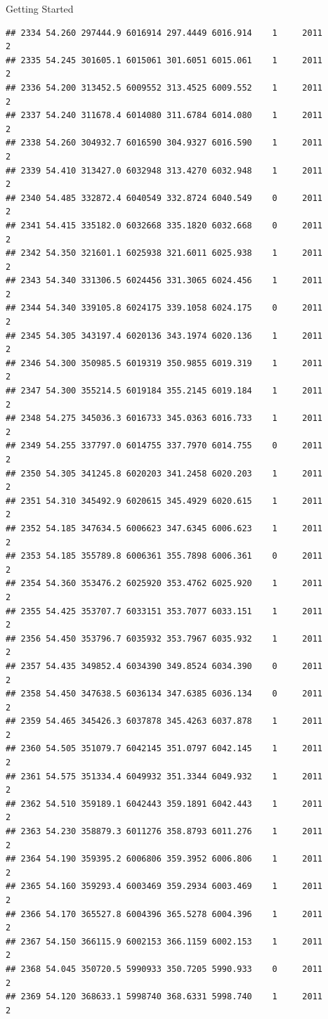 \documentclass[
  ignorenonframetext,
]{beamer}
\begin{document}
\begin{frame}[fragile]{Getting Started}
\begin{verbatim}
## 2334 54.260 297444.9 6016914 297.4449 6016.914    1     2011        2
## 2335 54.245 301605.1 6015061 301.6051 6015.061    1     2011        2
## 2336 54.200 313452.5 6009552 313.4525 6009.552    1     2011        2
## 2337 54.240 311678.4 6014080 311.6784 6014.080    1     2011        2
## 2338 54.260 304932.7 6016590 304.9327 6016.590    1     2011        2
## 2339 54.410 313427.0 6032948 313.4270 6032.948    1     2011        2
## 2340 54.485 332872.4 6040549 332.8724 6040.549    0     2011        2
## 2341 54.415 335182.0 6032668 335.1820 6032.668    0     2011        2
## 2342 54.350 321601.1 6025938 321.6011 6025.938    1     2011        2
## 2343 54.340 331306.5 6024456 331.3065 6024.456    1     2011        2
## 2344 54.340 339105.8 6024175 339.1058 6024.175    0     2011        2
## 2345 54.305 343197.4 6020136 343.1974 6020.136    1     2011        2
## 2346 54.300 350985.5 6019319 350.9855 6019.319    1     2011        2
## 2347 54.300 355214.5 6019184 355.2145 6019.184    1     2011        2
## 2348 54.275 345036.3 6016733 345.0363 6016.733    1     2011        2
## 2349 54.255 337797.0 6014755 337.7970 6014.755    0     2011        2
## 2350 54.305 341245.8 6020203 341.2458 6020.203    1     2011        2
## 2351 54.310 345492.9 6020615 345.4929 6020.615    1     2011        2
## 2352 54.185 347634.5 6006623 347.6345 6006.623    1     2011        2
## 2353 54.185 355789.8 6006361 355.7898 6006.361    0     2011        2
## 2354 54.360 353476.2 6025920 353.4762 6025.920    1     2011        2
## 2355 54.425 353707.7 6033151 353.7077 6033.151    1     2011        2
## 2356 54.450 353796.7 6035932 353.7967 6035.932    1     2011        2
## 2357 54.435 349852.4 6034390 349.8524 6034.390    0     2011        2
## 2358 54.450 347638.5 6036134 347.6385 6036.134    0     2011        2
## 2359 54.465 345426.3 6037878 345.4263 6037.878    1     2011        2
## 2360 54.505 351079.7 6042145 351.0797 6042.145    1     2011        2
## 2361 54.575 351334.4 6049932 351.3344 6049.932    1     2011        2
## 2362 54.510 359189.1 6042443 359.1891 6042.443    1     2011        2
## 2363 54.230 358879.3 6011276 358.8793 6011.276    1     2011        2
## 2364 54.190 359395.2 6006806 359.3952 6006.806    1     2011        2
## 2365 54.160 359293.4 6003469 359.2934 6003.469    1     2011        2
## 2366 54.170 365527.8 6004396 365.5278 6004.396    1     2011        2
## 2367 54.150 366115.9 6002153 366.1159 6002.153    1     2011        2
## 2368 54.045 350720.5 5990933 350.7205 5990.933    0     2011        2
## 2369 54.120 368633.1 5998740 368.6331 5998.740    1     2011        2

\end{verbatim}
\end{frame}
\end{document}

